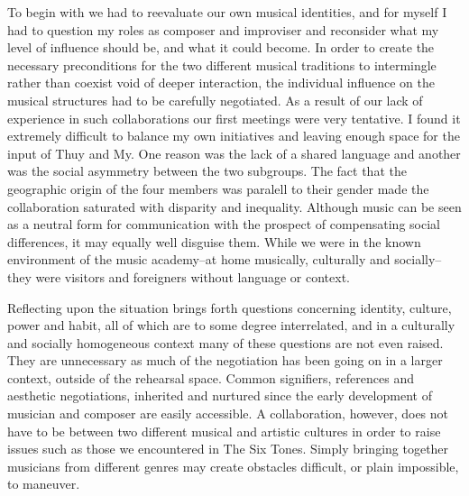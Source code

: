 \documentclass[a4paper]{article}
\begin{document}
To begin with we had to reevaluate our own musical identities, and for myself I had to question my roles as composer and improviser and reconsider what my level of influence should be, and what it could become. In order to create the necessary preconditions for the two different musical traditions to intermingle rather than coexist void of deeper interaction, the individual influence on the musical structures had to be carefully negotiated. As a result of our lack of experience in such collaborations our first meetings were very tentative. I found it extremely difficult to balance my own initiatives and leaving enough space for the input of Thuy and My. One reason was the lack of a shared language and another was the social asymmetry between the two subgroups. The fact that the geographic origin of the four members was paralell to their gender made the collaboration saturated with disparity and inequality. Although music can be seen as a neutral form for communication with the prospect of compensating social differences, it may equally well disguise them. While we were in the known environment of the music academy--at home musically, culturally and socially--they were visitors and foreigners without language or context. 

Reflecting upon the situation brings forth questions concerning identity, culture, power and habit, all of which are to some degree interrelated, and in a culturally and socially homogeneous context many of these questions are not even raised. They are unnecessary as much of the negotiation has been going on in a larger context, outside of the rehearsal space. Common signifiers, references and aesthetic negotiations, inherited and nurtured since the early development of musician and composer are easily accessible. A collaboration, however, does not have to be between two different musical and artistic cultures in order to raise issues such as those we encountered in The Six Tones. Simply bringing together musicians from different genres may create obstacles difficult, or plain impossible, to maneuver. 
\end{document}
